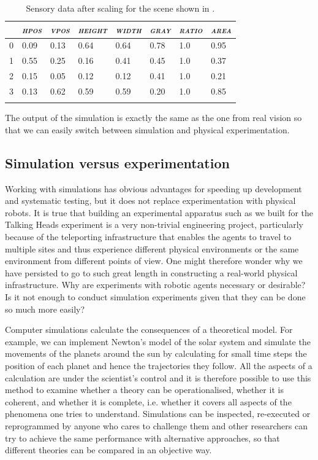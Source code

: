 \begin{table}[h]
\begin{center}
\begin{tabular}{  l   l   l   l   l   l   l   l  }
\lsptoprule
& {\itshape \textsc{hpos}} & {\itshape \textsc{vpos}} & {\itshape \textsc{height}} & {\itshape \textsc{width}} & {\itshape \textsc{gray}} & {\itshape \textsc{ratio}}  & {\itshape \textsc{area}} \\ \midrule
0 & 0.09 & 0.13 &  0.64 &  0.64 &  0.78 &  1.0 & 0.95 \\ 
1 & 0.55 & 0.25 & 0.16 & 0.41 & 0.45 & 1.0 & 0.37 \\ 
2 & 0.15 & 0.05 & 0.12 & 0.12 & 0.41 & 1.0 & 0.21 \\ 
3 & 0.13 & 0.62 & 0.59 & 0.59 & 0.20 & 1.0 & 0.85 \\ 
\lspbottomrule
\end{tabular}
\end{center}
\caption{\label{tab:t-geomscaled}Sensory data after scaling for the scene shown in .}
\end{table}

The output of the simulation is exactly the same as the one from real vision 
so that we can easily switch between simulation 
and physical experimentation. 

\subsection{Simulation versus experimentation}

Working  with simulations has obvious advantages for 
speeding up development and systematic testing, 
but it does not replace experimentation with 
physical robots. It is true that 
building an experimental apparatus such as we built
for the Talking Heads experiment is a very 
non-trivial engineering project, particularly because 
of the teleporting infrastructure that enables the agents 
to travel to multiple sites and thus 
experience different physical environments or the same 
environment from different points of view. 
One might therefore wonder why we have persisted
to go to such great length in constructing
a real-world physical infrastructure. Why are
experiments with robotic agents necessary or 
desirable? Is it not enough to conduct simulation
experiments given that they can be done so much 
more easily? 

Computer simulations calculate the consequences of a
theoretical model. For example, we can implement Newton's
model of the solar system and simulate the movements
of the planets around the sun by calculating for 
small time steps the position of each planet and hence
the trajectories they follow. All the aspects of 
a calculation are under the scientist's control and it 
is therefore possible to use this method to examine whether a theory can 
be operationalised, whether it is coherent, and whether 
it is complete, i.e. whether it covers all 
aspects of the phenomena one tries to understand. 
Simulations can be inspected, re-executed
or reprogrammed by anyone who cares to challenge them and
other researchers can try to achieve the
same performance with alternative approaches, so that 
different theories can be compared in an objective way. 

